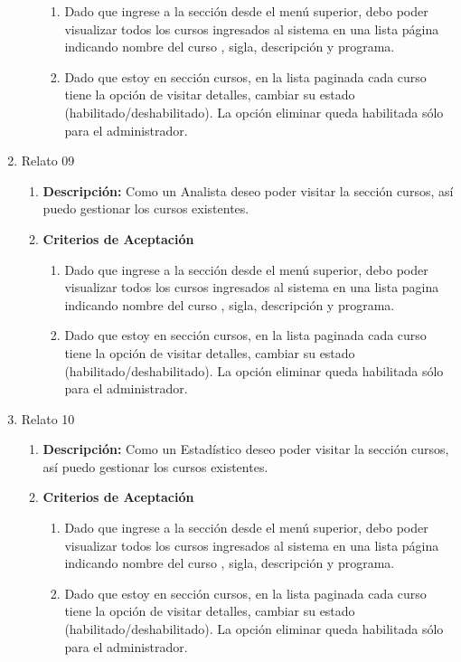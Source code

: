 \begin{enumerate}
\begin{enumerate}
				\begin{enumerate}
					\item Dado que ingrese a la sección desde el menú superior, debo poder visualizar todos los cursos ingresados al sistema en una lista página indicando nombre del curso , sigla, descripción y programa.
					\item Dado que estoy en sección cursos, en la lista paginada cada curso tiene la opción de visitar detalles, cambiar su estado (habilitado/deshabilitado). La opción eliminar queda habilitada sólo para el administrador.
				\end{enumerate}
		\end{enumerate}
	\item Relato 09
		\begin{enumerate}
			\item \textbf{Descripción:} Como un Analista deseo poder visitar la sección cursos, así puedo gestionar los cursos existentes.
			\item \textbf{Criterios de Aceptación}
				\begin{enumerate}
					\item Dado que ingrese a la sección desde el menú superior, debo poder visualizar todos los cursos ingresados al sistema en una lista pagina indicando nombre del curso , sigla, descripción y programa.
					\item Dado que estoy en sección cursos, en la lista paginada cada curso tiene la opción de visitar detalles, cambiar su estado (habilitado/deshabilitado). La opción eliminar queda habilitada sólo para el administrador.
				\end{enumerate}
		\end{enumerate}
	\item Relato 10
		\begin{enumerate}
			\item \textbf{Descripción:} Como un Estadístico deseo poder visitar la sección cursos, así puedo gestionar los cursos existentes.
			\item \textbf{Criterios de Aceptación}
				\begin{enumerate}
					\item Dado que ingrese a la sección desde el menú superior, debo poder visualizar todos los cursos ingresados al sistema en una lista página indicando nombre del curso , sigla, descripción y programa.
					\item Dado que estoy en sección cursos, en la lista paginada cada curso tiene la opción de visitar detalles, cambiar su estado (habilitado/deshabilitado). La opción eliminar queda habilitada sólo para el administrador.

\end{enumerate}
\end{enumerate}
\end{enumerate}
